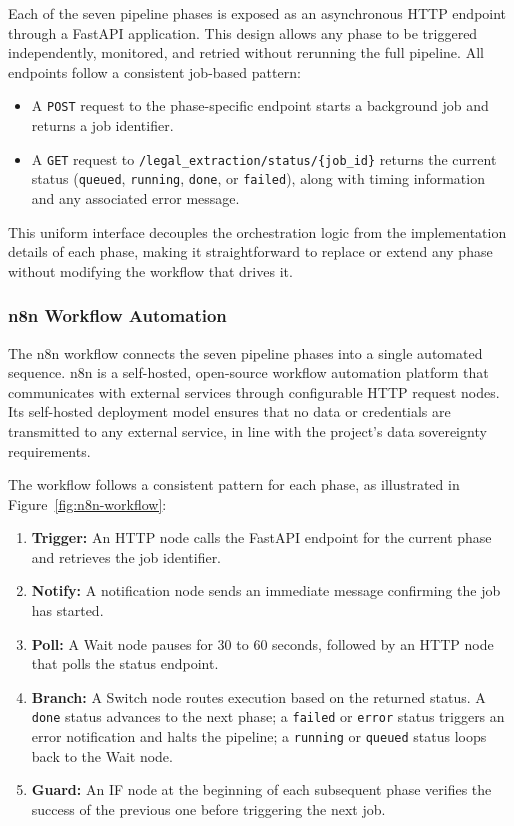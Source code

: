 Each of the seven pipeline phases is exposed as an asynchronous \ac{HTTP} endpoint through a FastAPI \cite{fastapi2024docs} application. This design allows any phase to be triggered independently, monitored, and retried without rerunning the full pipeline. All endpoints follow a consistent job-based pattern:

\begin{itemize}
    \item A \texttt{POST} request to the phase-specific endpoint starts a background job and returns a job identifier.
    \item A \texttt{GET} request to \texttt{/legal\_extraction/status/\{job\_id\}} returns the current status (\texttt{queued}, \texttt{running}, \texttt{done}, or \texttt{failed}), along with timing information and any associated error message.
\end{itemize}

This uniform interface decouples the orchestration logic from the implementation details of each phase, making it straightforward to replace or extend any phase without modifying the workflow that drives it.

\subsubsection{n8n Workflow Automation}
\label{subsec:n8n-automation}

The n8n \cite{n8n2024docs} workflow connects the seven pipeline phases into a single automated sequence. n8n is a self-hosted, open-source workflow automation platform that communicates with external services through configurable \ac{HTTP} request nodes. Its self-hosted deployment model ensures that no data or credentials are transmitted to any external service, in line with the project's data sovereignty requirements.

\vspace{1em}

The workflow follows a consistent pattern for each phase, as illustrated in Figure~\ref{fig:n8n-workflow}:

\begin{enumerate}
    \item \textbf{Trigger:} An \ac{HTTP} node calls the FastAPI endpoint for the current phase and retrieves the job identifier.
    \item \textbf{Notify:} A notification node sends an immediate message confirming the job has started.
    \item \textbf{Poll:} A Wait node pauses for 30 to 60 seconds, followed by an \ac{HTTP} node that polls the status endpoint.
    \item \textbf{Branch:} A Switch node routes execution based on the returned status. A \texttt{done} status advances to the next phase; a \texttt{failed} or \texttt{error} status triggers an error notification and halts the pipeline; a \texttt{running} or \texttt{queued} status loops back to the Wait node.
    \item \textbf{Guard:} An IF node at the beginning of each subsequent phase verifies the success of the previous one before triggering the next job.
\end{enumerate}

